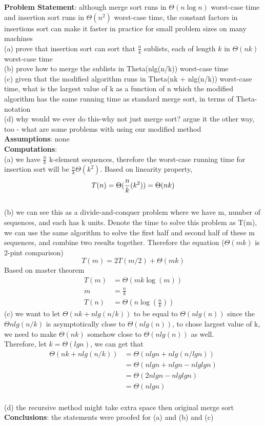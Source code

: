 \documentclass[12pt]{article}
\newenvironment{proposition}[2][Proposition]{\begin{trivlist}
\item[\hskip \labelsep {\bfseries #1}\hskip \labelsep {\bfseries #2.}]}{\end{trivlist}}
\begin{document}
\begin{proposition}{5}
\end{proposition}
\setlength{\parindent}{0pt}
\textbf{Problem Statement}: although merge sort runs in $\Theta(n\log n)$ worst-case time and insertion sort runs in $\Theta(n^2)$ worst-case time, the constant factors in insertions sort can make it faster in practice for small problem sizes on many machines \\
(a) prove that insertion sort can sort that $\frac{n}{k}$ sublists, each of length $k$ in $\Theta(nk)$ worst-case  time \\
(b) prove how to merge the sublists in Theta(nlg(n/k)) worst-case time \\
(c) given that the modified algorithm runs in Theta(nk + nlg(n/k)) worst-case time, what is the largest value of k as a function of n which the modified algorithm has the same running time as standard merge sort, in terms of Theta-notation \\
(d) why would we ever do this-why not just merge sort? argue it the other way, too - what are some problems with using our modified method \\
\textbf{Assumptions}: none\\
\textbf{Computations}: \\
(a) we have $\frac{n}{k}$ k-element sequences, therefore the worst-case running time for insertion sort will be $\frac{n}{k}\Theta(k^2)$. Based on linearity property, $$T(n ) = \Theta(\frac{n}{k}(k^2))\\ =\Theta(nk)$$\\
(b) we can see this as a divide-and-conquer problem where we have m, number of sequences, and each has k units. Denote the time to solve this problem as T(m), we can use the same algorithm to solve the first half and second half of these m sequences, and combine two results together. Therefore the equation ($\Theta(mk)$ is 2-pint comparison) $$T(m) = 2T(m/2) +\Theta(mk)$$
 Based on master theorem \\
 \begin{align*}
     T(m) &=\Theta(mk\log(m)) \\
     m &= \frac{n}{k} \\
     T(n) &= \Theta(n\log( \frac{n}{k})) 
 \end{align*}
 (c) we want to let $\Theta(nk+nlg(n/k))$ to be equal to $\Theta(nlg(n))$ since the $\Theta nlg(n/k)$ is asymptotically close to $\Theta(nlg(n))$, to chose largest value of k, we need to make $\Theta(nk)$ somehow close to $\Theta(nlg(n))$ as well.\\
 Therefore, let $k=\Theta(lg n )$, we can get that
 \begin{align*}
     \Theta(nk+nlg(n/k)) &= \Theta(nlgn+nlg(n/lgn)) \\
     &= \Theta(nlgn + nlgn - nlglgn) \\
     &= \Theta(2nlgn -nlglgn) \\
     &= \Theta(nlgn)
 \end{align*}
 \\
 (d) the recursive method might take extra space then original merge sort
\textbf{Conclusions}: the statements were proofed for (a) and (b) and (c)\\ 

 
\end{document}
